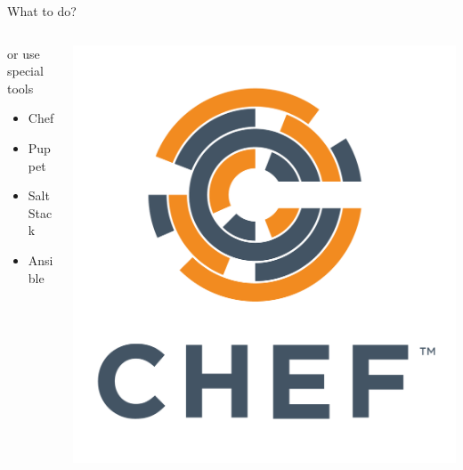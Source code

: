 \documentclass[16pt]{beamer}
\begin{document}
\begin{frame}{What to do?}
\begin{columns}[T]
\begin{column}{.6\textwidth}
        \vspace*{1\baselineskip}
        or use special tools
        \begin{itemize}
        \item
            Chef
        \item
            Puppet
        \item
            SaltStack
        \item
            Ansible
        \end{itemize}
    \end{column}
  \begin{column}{.4\textwidth}
    \includegraphics[scale=0.2]{images/Chef_Vertical_Reg_Without.png}


\end{column}
\end{columns}
\end{frame}
\end{document}
